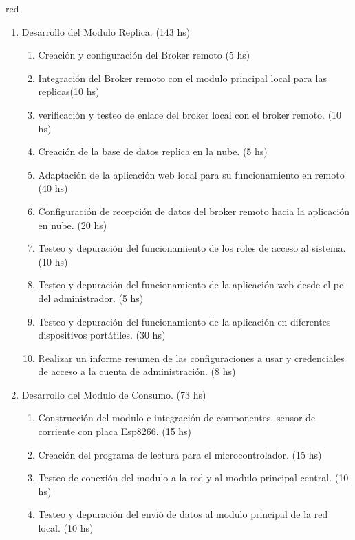 \documentclass[11pt]{charter}
\begin{document}
\begin{consigna}{red}
\begin{enumerate}
\begin{enumerate}
	\item Realizar un informe resumen de las características del modulo, aspectos de red, configuraciones a usar, credenciales de acceso del usuario root, versiones del software, credenciales de acceso a la administración a la base de datos y a la aplicación web. (8 hs)
	\end{enumerate}
\item Desarrollo del Modulo Replica. (143 hs)
	\begin{enumerate}
	\item Creación y configuración del Broker remoto (5 hs)
	\item Integración del Broker remoto con el modulo principal local para las replicas(10 hs)
	\item verificación y testeo de enlace del broker local con el broker remoto. (10 hs)
	\item Creación de la base de datos replica en la nube. (5 hs) 
	\item Adaptación de la aplicación web local para su funcionamiento en remoto  (40 hs)
	\item Configuración de recepción de datos del broker remoto hacia la aplicación en nube.  (20 hs)
	\item Testeo y depuración del funcionamiento de los roles de acceso al sistema. (10 hs) 
	\item Testeo y depuración del funcionamiento de la aplicación web desde el pc del administrador. (5 hs) 
	\item Testeo y depuración del funcionamiento de la aplicación en diferentes dispositivos portátiles. (30 hs)
	\item Realizar un informe resumen de las configuraciones a usar y credenciales de acceso a la cuenta de administración. (8 hs)
	\end{enumerate}
\item Desarrollo del Modulo de Consumo. (73 hs)
	\begin{enumerate}
	\item Construcción del modulo e integración de componentes, sensor de corriente con placa Esp8266. (15 hs)
	\item Creación del programa de lectura para el microcontrolador. (15 hs)
	\item Testeo de conexión del modulo a la red y al modulo principal central. (10 hs)
	\item Testeo y depuración del envió de datos al modulo principal de la red local. (10 hs)

\end{enumerate}
\end{enumerate}
\end{consigna}
\end{document}
